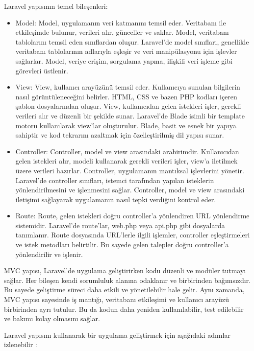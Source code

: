  Laravel  yapısının temel bileşenleri:
\begin{itemize}
\item Model:
Model, uygulamanın veri katmanını temsil eder. Veritabanı ile etkileşimde bulunur, verileri alır, günceller ve saklar. Model, veritabanı tablolarını temsil eden sınıflardan oluşur. Laravel'de model sınıfları, genellikle veritabanı tablolarının adlarıyla eşleşir ve veri manipülasyonu için işlevler sağlarlar. Model, veriye erişim, sorgulama yapma, ilişkili veri işleme gibi görevleri üstlenir.

\item View:
View, kullanıcı arayüzünü temsil eder. Kullanıcıya sunulan bilgilerin nasıl görüntüleneceğini belirler. HTML, CSS ve bazen PHP kodları içeren şablon dosyalarından oluşur. View, kullanıcıdan gelen istekleri işler, gerekli verileri alır ve düzenli bir şekilde sunar. Laravel'de Blade isimli bir template motoru kullanılarak view'lar oluşturulur. Blade, basit ve esnek bir yapıya sahiptir ve kod tekrarını azaltmak için özelleştirilmiş dil yapısı sunar.

\item Controller:
Controller, model ve view arasındaki arabirimdir. Kullanıcıdan gelen istekleri alır, modeli kullanarak gerekli verileri işler, view'a iletilmek üzere verileri hazırlar. Controller, uygulamanın mantıksal işlevlerini yönetir. Laravel'de controller sınıfları, istemci tarafından yapılan isteklerin yönlendirilmesini ve işlenmesini sağlar. Controller, model ve view arasındaki iletişimi sağlayarak uygulamanın nasıl tepki verdiğini kontrol eder.

\item Route:
Route, gelen istekleri doğru controller'a yönlendiren URL yönlendirme sistemidir. Laravel'de route'lar, web.php veya api.php gibi dosyalarda tanımlanır. Route dosyasında URL'lerle ilgili işlemler, controller eşleştirmeleri ve istek metodları belirtilir. Bu sayede gelen talepler doğru controller'a yönlendirilir ve işlenir.
\end{itemize}
MVC yapısı, Laravel'de uygulama geliştirirken kodu düzenli ve modüler tutmayı sağlar. Her bileşen kendi sorumluluk alanına odaklanır ve birbirinden bağımsızdır. Bu sayede geliştirme süreci daha etkili ve yönetilebilir hale gelir.
Aynı  zamanda, MVC yapısı sayesinde iş mantığı, veritabanı etkileşimi ve kullanıcı arayüzü birbirinden ayrı tutulur. Bu da kodun daha yeniden kullanılabilir, test edilebilir ve bakımı kolay olmasını sağlar.

Laravel yapısını kullanarak bir uygulama geliştirmek için aşağıdaki adımlar izlenebilir :

